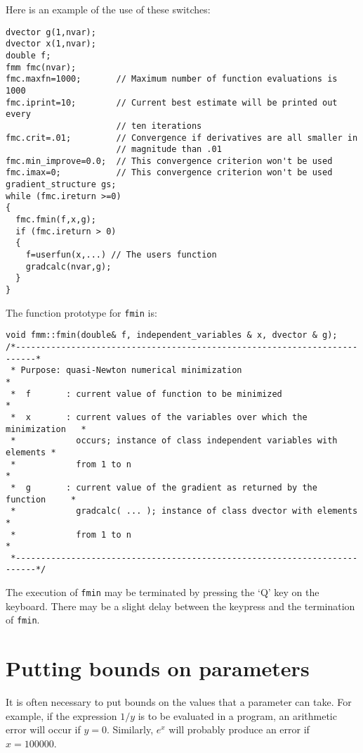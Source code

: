 \documentclass{admbmanual}
\begin{document}
Here is an example of the use of these switches:
\begin{lstlisting}
dvector g(1,nvar);
dvector x(1,nvar);
double f;
fmm fmc(nvar);
fmc.maxfn=1000;       // Maximum number of function evaluations is 1000
fmc.iprint=10;        // Current best estimate will be printed out every
                      // ten iterations
fmc.crit=.01;         // Convergence if derivatives are all smaller in
                      // magnitude than .01
fmc.min_improve=0.0;  // This convergence criterion won't be used
fmc.imax=0;           // This convergence criterion won't be used
gradient_structure gs;
while (fmc.ireturn >=0)
{
  fmc.fmin(f,x,g);
  if (fmc.ireturn > 0)
  {
    f=userfun(x,...) // The users function
    gradcalc(nvar,g);
  }
}
\end{lstlisting}

The function prototype for \texttt{fmin} is:
\begin{lstlisting}[escapechar=\%]
void fmm::fmin(double& f, independent_variables & x, dvector & g);
/*--------------------------------------------------------------------------*
 * Purpose: quasi-Newton numerical minimization                             *
 *  f       : current value of function to be minimized                     *
 *  x       : current values of the variables over which the minimization   *
 *            occurs; instance of class independent variables with elements *
 *            from 1 to n                                                   *
 *  g       : current value of the gradient as returned by the function     *
 *            gradcalc( ... ); instance of class dvector with elements      *
 *            from 1 to n                                                   *
 *--------------------------------------------------------------------------*/
\end{lstlisting}

The execution of \texttt{fmin} may be terminated by pressing the `Q' key on the
keyboard. There may be a slight delay between the keypress and the termination
of \texttt{fmin}.

\section{Putting bounds on parameters}

It is often necessary to put bounds on the values that a parameter can take. For
example, if the expression $1/y$ is to be evaluated in a program, an arithmetic
error will occur if $y=0$. Similarly, $e^x$ will probably produce an error if
$x=100000$.
\end{document}
